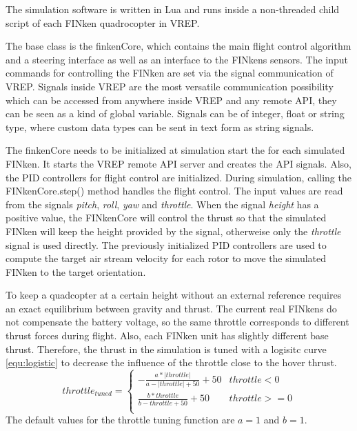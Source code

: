 The simulation software is written in Lua and runs inside a non-threaded child script of each FINken quadrocopter in VREP.  

The base class is the finkenCore, which contains the main flight control algorithm and a steering interface as well as an interface to the FINkens sensors.
The input commands for controlling the FINken are set via the signal communication of VREP. Signals inside VREP are the most versatile communication possibility which can be accessed from anywhere inside VREP and any remote API, they can be seen as a kind of global variable. Signals can be of integer, float or string type, where custom data types can be sent in text form as string signals. 

The finkenCore needs to be initialized at simulation start the for each simulated FINken. It starts the VREP remote API server and creates the API signals. Also, the PID controllers for flight control are initialized. 
During simulation, calling the FINkenCore.step() method handles the flight control. The input values are read from the signals \textit{pitch}, \textit{roll}, \textit{yaw} and \textit{throttle}. When the signal \textit{height} has a positive value, the FINkenCore will control the thrust so that the simulated FINken will keep the height provided by the signal, otherweise only the \textit{throttle} signal is used directly. The previously initialized PID controllers are used to compute the target air stream velocity for each rotor to move the simulated FINken to the target orientation.

To keep a quadcopter at a certain height without an external reference requires an exact equilibrium between gravity and thrust. The current real FINkens do not compensate the battery voltage, so the same throttle corresponds to different thrust forces during flight. Also, each FINken unit has slightly different base thrust. Therefore, the thrust in the simulation is tuned with a logisitc curve \ref{equ:logistic} to decrease the influence of the throttle close to the hover thrust. 
\begin{equation}
throttle_{tuned} = \begin{cases}
-\frac{a * |throttle|}{a - |throttle| + 50} + 50 & throttle < 0 \\
\frac{b * throttle}{b - throttle + 50} + 50 & throttle >= 0\\
\end{cases}
\label{equ:logistic}
\end{equation}
The default values for the throttle tuning function are  $a = 1$ and $b = 1$. 


